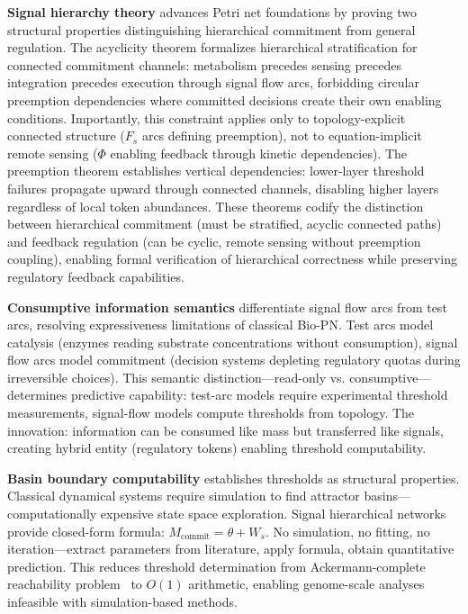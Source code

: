 \documentclass[10pt,letterpaper]{article}
\begin{document}
\textbf{Signal hierarchy theory} advances Petri net foundations by proving two structural properties distinguishing hierarchical commitment from general regulation. The acyclicity theorem formalizes hierarchical stratification for connected commitment channels: metabolism precedes sensing precedes integration precedes execution through signal flow arcs, forbidding circular preemption dependencies where committed decisions create their own enabling conditions. Importantly, this constraint applies only to topology-explicit connected structure ($F_s$ arcs defining preemption), not to equation-implicit remote sensing ($\Phi$ enabling feedback through kinetic dependencies). The preemption theorem establishes vertical dependencies: lower-layer threshold failures propagate upward through connected channels, disabling higher layers regardless of local token abundances. These theorems codify the distinction between hierarchical commitment (must be stratified, acyclic connected paths) and feedback regulation (can be cyclic, remote sensing without preemption coupling), enabling formal verification of hierarchical correctness while preserving regulatory feedback capabilities.

\textbf{Consumptive information semantics} differentiate signal flow arcs from test arcs, resolving expressiveness limitations of classical Bio-PN. Test arcs model catalysis (enzymes reading substrate concentrations without consumption), signal flow arcs model commitment (decision systems depleting regulatory quotas during irreversible choices). This semantic distinction---read-only vs. consumptive---determines predictive capability: test-arc models require experimental threshold measurements, signal-flow models compute thresholds from topology. The innovation: information can be consumed like mass but transferred like signals, creating hybrid entity (regulatory tokens) enabling threshold computability.

\textbf{Basin boundary computability} establishes thresholds as structural properties. Classical dynamical systems require simulation to find attractor basins---computationally expensive state space exploration. Signal hierarchical networks provide closed-form formula: $M_{\text{commit}} = \theta + W_s$. No simulation, no fitting, no iteration---extract parameters from literature, apply formula, obtain quantitative prediction. This reduces threshold determination from Ackermann-complete reachability problem~\cite{czerwinski2021} to $O(1)$ arithmetic, enabling genome-scale analyses infeasible with simulation-based methods.
\end{document}

